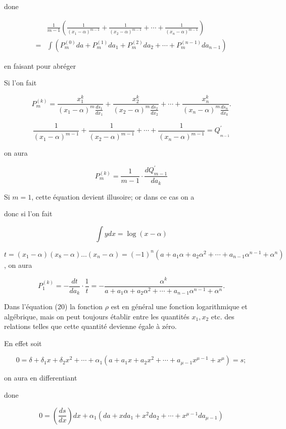 \documentclass{article}
\begin{document}
done

\[
\begin{aligned}
& \frac{1}{m-1}\left(\frac{1}{\left(x_{1}-\alpha\right)^{m-1}}+\frac{1}{\left(x_{2}-\alpha\right)^{m-1}}+\cdots+\frac{1}{\left(x_{n}-\alpha\right)^{m-1}}\right) \\
= & \int\left(P_{m}^{(0)} d a+P_{m}^{(1)} d a_{1}+P_{m}^{(2)} d a_{2}+\cdots+P_{m}^{(n-1)} d a_{n-1}\right)
\end{aligned}
\]

en faisant pour abréger

Si l'on fait

\[
P_{m}^{(k)}=\frac{x_{1}^{k}}{\left(x_{1}-\alpha\right)^{m} \frac{d s_{1}}{d x_{1}}}+\frac{x_{2}^{k}}{\left(x_{2}-\alpha\right)^{m} \frac{d s_{2}}{d x_{2}}}+\cdots+\frac{x_{n}^{k}}{\left(x_{n}-\alpha\right)^{m} \frac{d s_{n}}{d x_{k}}} .
\]

\[
\frac{1}{\left(x_{1}-\alpha\right)^{m-1}}+\frac{1}{\left(x_{2}-\alpha\right)^{m-1}}+\cdots+\frac{1}{\left(x_{n}-\alpha\right)^{m-1}}=Q_{{ }_{m-1}}^{\prime}
\]

on aura

\[
P_{m}^{(k)}=\frac{1}{m-1} \cdot \frac{d Q_{m-1}^{\prime}}{d a_{k}}
\]

Si \(m=1\), cette équation devient illusoire; or dans ce cas on a

donc si l'on fait

\[
\int y d x=\log (x-\alpha)
\]

\(t=\left(x_{1}-\alpha\right)\left(x_{8}-\alpha\right) \ldots\left(x_{n}-\alpha\right)=(-1)^{n}\left(a+a_{1} \alpha+a_{2} \alpha^{2}+\cdots+a_{n-1} \alpha^{n-1}+\alpha^{n}\right)\), on aura

\[
P_{1}^{(k)}=-\frac{d t}{d a_{k}} \cdot \frac{1}{t}=-\frac{\alpha^{k}}{a+a_{1} \alpha+a_{2} \alpha^{2}+\cdots+a_{n-1} \alpha^{n-1}+\alpha^{n}} .
\]

Dans l'équation (20) la fonction \(\rho\) est en général une fonction logarithmique et algébrique, mais on peut toujours établir entre les quantités \(x_{1}, x_{2}\) etc. des relations telles que cette quantité devienne égale à zéro.

En effet soit

\[
0=\delta+\delta_{1} x+\delta_{2} x^{2}+\cdots+\alpha_{1}\left(a+a_{1} x+a_{2} x^{2}+\cdots+a_{\mu-1} x^{\mu-1}+x^{\mu}\right)=s ;
\]

on aura en differentiant

done

\[
0=\left(\frac{d s}{d x}\right) d x+\alpha_{1}\left(d a+x d a_{1}+x^{2} d a_{2}+\cdots+x^{\mu-1} d a_{\mu-1}\right)
\]
\end{document}

